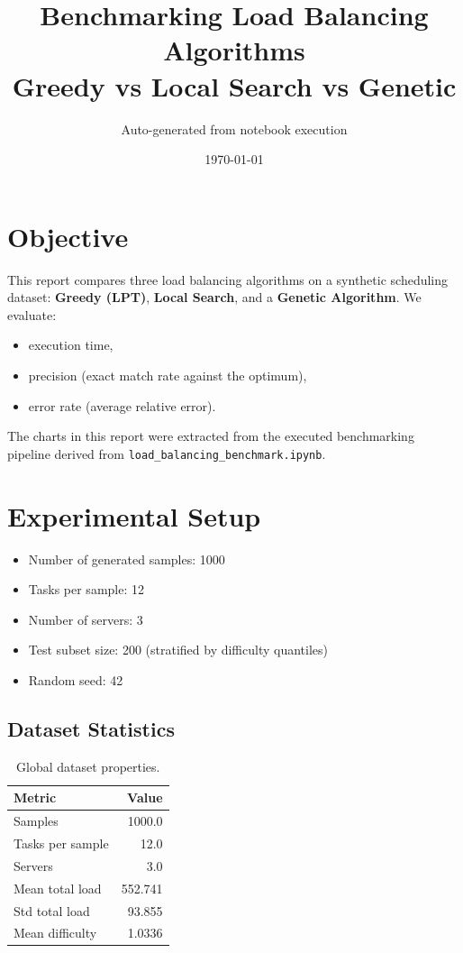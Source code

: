 \documentclass[11pt]{article}
\title{Benchmarking Load Balancing Algorithms\\\large Greedy vs Local Search vs Genetic}
\author{Auto-generated from notebook execution}
\date{\today}
\begin{document}
\maketitle

\section{Objective}
This report compares three load balancing algorithms on a synthetic scheduling dataset:
\textbf{Greedy (LPT)}, \textbf{Local Search}, and a \textbf{Genetic Algorithm}. We evaluate:
\begin{itemize}
  \item execution time,
  \item precision (exact match rate against the optimum),
  \item error rate (average relative error).
\end{itemize}
The charts in this report were extracted from the executed benchmarking pipeline derived from
\texttt{load\_balancing\_benchmark.ipynb}.

\section{Experimental Setup}
\begin{itemize}
  \item Number of generated samples: 1000
  \item Tasks per sample: 12
  \item Number of servers: 3
  \item Test subset size: 200 (stratified by difficulty quantiles)
  \item Random seed: 42
\end{itemize}

\subsection*{Dataset Statistics}
\begin{table}[H]
\centering
\begin{tabular}{lr}
\toprule
Metric & Value \\
\midrule
Samples & 1000.0 \\
Tasks per sample & 12.0 \\
Servers & 3.0 \\
Mean total load & 552.741 \\
Std total load & 93.855 \\
Mean difficulty & 1.0336 \\
\bottomrule
\end{tabular}
\caption{Global dataset properties.}
\end{table}
\end{document}
